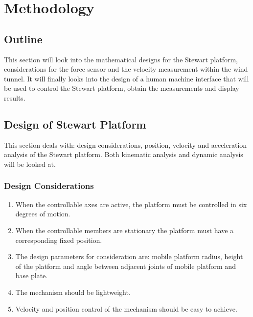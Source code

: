\section{Methodology}
\subsection{Outline}
This section will look into the mathematical designs for the Stewart platform, considerations for the force sensor and the velocity measurement within the wind tunnel. It will finally looks into the design of a human machine interface that will be used to control the Stewart platform,  obtain the measurements and display results.

\subsection{Design of Stewart Platform}
This section deals with: design considerations, position, velocity and acceleration analysis of the Stewart platform. Both kinematic analysis and dynamic analysis will be looked at.
\subsubsection{Design Considerations}
\begin{enumerate}
\item When the controllable axes are active, the platform must be controlled in six degrees of motion.
\item When the controllable members are stationary the
platform must have a corresponding fixed position.
\item The design parameters for consideration are: mobile platform radius, height of the platform and angle between adjacent joints of mobile platform and base plate.
\item The mechanism should be lightweight.
\item Velocity and position control of the mechanism should be easy to achieve.
\end{enumerate}

